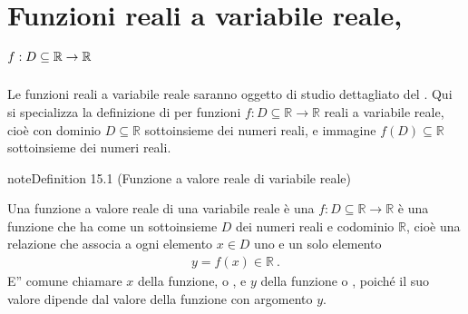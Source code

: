 \documentclass[letterpaper,10pt,italian]{jupyterBook}
\begin{document}
\sphinxstepscope




\chapter{Funzioni reali a variabile reale, \protect\(f: D \subseteq \mathbb{R} \rightarrow \mathbb{R}\protect\)}
\label{\detokenize{ch/precalculus/real-functions:funzioni-reali-a-variabile-reale-f-d-subseteq-mathbb-r-rightarrow-mathbb-r}}\label{\detokenize{ch/precalculus/real-functions:math-hs-precalculus-real-functions}}\label{\detokenize{ch/precalculus/real-functions::doc}}
\sphinxAtStartPar
Le funzioni reali a variabile reale saranno oggetto di studio dettagliato del {\hyperref[\detokenize{ch/infinitesimal_calculus/analysis:infinitesimal-calculus-analysis}]{}}. Qui si specializza la definizione di {\hyperref[\detokenize{ch/set:math-hs-fun}]{}} per funzioni \(f: D \subseteq \mathbb{R} \rightarrow \mathbb{R}\) reali a variabile reale, cioè con dominio \(D \subseteq \mathbb{R}\) sottoinsieme dei numeri reali, e immagine \(f(D) \subseteq \mathbb{R}\) sottoinsieme dei numeri reali.
\label{ch/precalculus/real-functions:precalculus-real-fun}
\begin{sphinxadmonition}{note}{Definition 15.1 (Funzione a valore reale di variabile reale)}



\sphinxAtStartPar
Una funzione a valore reale di una variabile reale è una {\hyperref[\detokenize{ch/set:math-hs-fun}]{}} \(f: D \subseteq \mathbb{R} \rightarrow \mathbb{R}\) è una funzione che ha come  un sottoinsieme \(D\) dei numeri reali e codominio \(\mathbb{R}\), cioè una relazione che associa a ogni elemento \(x \in D\) uno e un solo elemento
\begin{equation*}
\begin{split}y = f(x) \in \mathbb{R} \ .\end{split}
\end{equation*}
\sphinxAtStartPar
E” comune chiamare \(x\)  della funzione, o , e \(y\)  della funzione o , poiché il suo valore dipende dal valore della funzione con argomento \(y\).
\end{sphinxadmonition}
\end{document}
